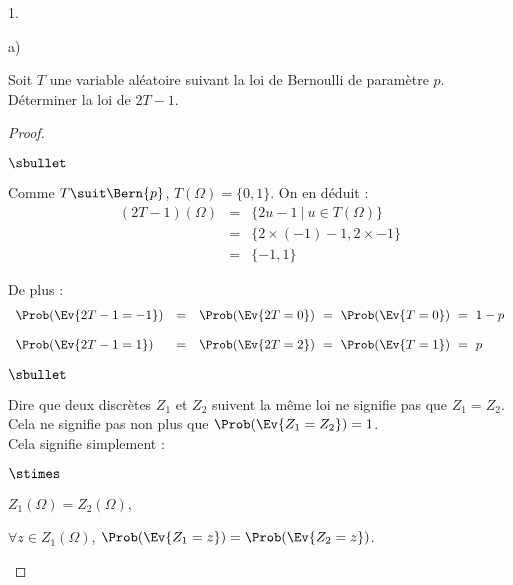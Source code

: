 \documentclass[11pt]{article}%
\begin{document}
\begin{noliste}{1.}
\item
  \begin{noliste}{a)}
    \setlength{\itemsep}{2mm}
  \item Soit $T$ une variable aléatoire suivant la loi de Bernoulli de
    paramètre $p$.\\
    Déterminer la loi de $2T-1$.

    \begin{proof}~
      \begin{noliste}{$\sbullet$}
      \item Comme $T \suit \Bern{p}$, $T(\Omega) = \{0,
        1\}$. On en déduit :
        \[
        \begin{array}{rcl}
          (2T-1)(\Omega) & = & \{ 2 u - 1 \ | \ u \in T(\Omega) \} 
          \\[.2cm]
          & = & \{2 \times (-1) - 1, 2 \times - 1\} 
          \\[.2cm]
          & = & \{-1, 1\}
        \end{array}
        \]

      \item De plus :
        \[
        \begin{array}{lcl}
          \Prob(\Ev{2T-1 = -1}) & = & \Prob(\Ev{2T = 0}) \ = \ \Prob(\Ev{T = 0})
          \ = \ 1 - p \\[.4cm]
          \Prob(\Ev{2T-1 = 1}) & = & \Prob(\Ev{2T = 2}) \ = \ \Prob(\Ev{T = 1})
          \ = \ p
        \end{array}
        \]
      \end{noliste}
      \begin{remarkL}{.97}%
        \begin{noliste}{$\sbullet$}
        \item Dire que deux \var discrètes $Z_1$ et $Z_2$ suivent la même
          loi ne signifie pas que $Z_1 = Z_2$.\\
          Cela ne signifie pas non plus que $\Prob(\Ev{Z_1 = Z_2}) = 1$.\\
          Cela signifie simplement :
          \begin{noliste}{$\stimes$}
          \item $Z_1(\Omega) = Z_2(\Omega)$,
          \item $\forall z \in Z_1(\Omega)$, $\Prob(\Ev{Z_1 = z}) =
            \Prob(\Ev{Z_2 = z})$.
          \end{noliste}


\end{noliste}
\end{remarkL}
\end{proof}
\end{noliste}
\end{noliste}
\end{document}
